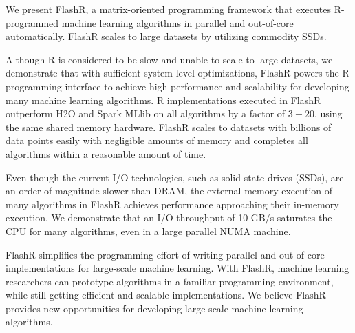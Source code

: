 We present FlashR, a matrix-oriented programming framework that executes
R-programmed machine learning algorithms in parallel and out-of-core
automatically. FlashR scales to large datasets by utilizing commodity SSDs.


Although R is considered to be slow and unable to scale to large datasets,
we demonstrate that with sufficient system-level optimizations, FlashR powers
the R programming interface to achieve high performance and scalability
for developing many machine learning algorithms. R implementations executed in FlashR
outperform H2O and Spark MLlib on all algorithms by a factor of $3-20$, using
the same shared memory hardware. FlashR scales to datasets with billions of
data points easily with negligible amounts of memory and completes all
algorithms within a reasonable amount of time.

Even though the current I/O technologies, such as solid-state drives (SSDs),
are an order of magnitude slower than DRAM, the external-memory execution
of many algorithms in FlashR achieves performance approaching their in-memory
execution. We demonstrate that an I/O throughput of 10 GB/s saturates the CPU
for many algorithms, even in a large parallel NUMA machine. 

FlashR simplifies the programming effort of writing parallel and out-of-core
implementations for large-scale machine learning. With FlashR, machine learning
researchers can prototype algorithms in a familiar programming environment,
while still getting efficient and scalable implementations.
We believe FlashR provides new opportunities for developing large-scale
machine learning algorithms.

